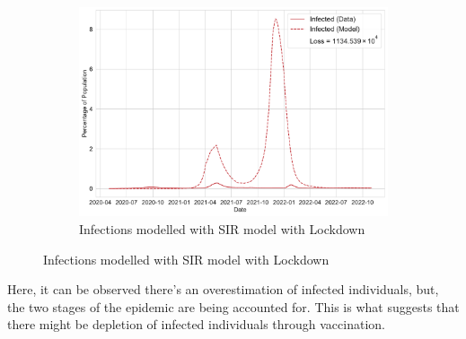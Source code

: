 \documentclass[tikz,fleqn,12pt]{wlscirep}
\begin{document}
\begin{figure}[htbp!]\ContinuedFloat
  \begin{subfigure}[t]{\textwidth}
    \centering
    \includegraphics[scale=0.50]{images/SIR_model_with_lockdown_infections_IND.pdf}
    \caption{Infections modelled with SIR model with Lockdown}
    \label{fig:SIR_model_with_lockdown_infections_IND}
  \end{subfigure}
\end{figure}
Here, it can be observed there's an overestimation of infected individuals, but, the two stages of the epidemic are being accounted for. This is what suggests that there might be depletion of infected individuals through vaccination.
\end{document}
